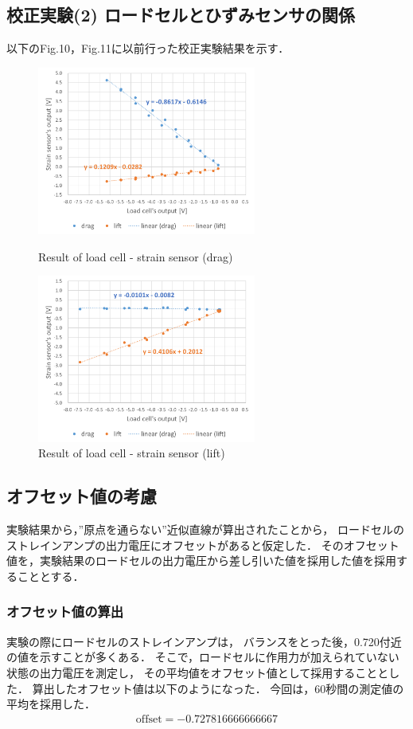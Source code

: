 \documentclass[twocolumn,a4j]{jsarticle}
\begin{document}
\subsection{校正実験(2) ロードセルとひずみセンサの関係}
以下のFig.10，Fig.11に以前行った校正実験結果を示す．
\begin{figure}[htbp]
    \footnotesize
    \begin{center}
        \includegraphics[width=72mm]{../images/calibration_2_drag.png}
        \caption{Result of load cell - strain sensor (drag)}
        \includegraphics[width=72mm]{../images/calibration_2_lift.png}
        \caption{Result of load cell - strain sensor (lift)}
    \end{center}
\end{figure}

\newpage
\subsection{オフセット値の考慮}
実験結果から，”原点を通らない”近似直線が算出されたことから，
ロードセルのストレインアンプの出力電圧にオフセットがあると仮定した．
そのオフセット値を，実験結果のロードセルの出力電圧から差し引いた値を採用した値を採用することとする．\\
\subsubsection{オフセット値の算出}
実験の際にロードセルのストレインアンプは，
バランスをとった後，0.720付近の値を示すことが多くある．
そこで，ロードセルに作用力が加えられていない状態の出力電圧を測定し，
その平均値をオフセット値として採用することとした．
算出したオフセット値は以下のようになった．
今回は，60秒間の測定値の平均を採用した．
\begin{eqnarray*}
  \mathrm{offset} = -0.727816666666667
\end{eqnarray*}
\end{document}
